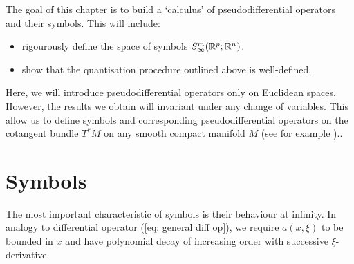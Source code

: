 \documentclass[12pt]{article}
\begin{document}
The goal of this chapter is to build a `calculus' of pseudodifferential operators and their symbols. This will include: 
\begin{itemize}
    \item rigourously define the space of symbols $S^{m}_{\infty}({\mathbb R}^{p}; {\mathbb R}^{n})$. 
    \item show that the quantisation procedure outlined above is well-defined. 
\end{itemize} 

Here, we will introduce pseudodifferential operators only on Euclidean spaces. However, the results we obtain will invariant under any change of variables.  This allow us to define symbols and corresponding pseudodifferential operators on the cotangent bundle $T^*M$ on any smooth compact manifold $M$ (see for example \cite[Chapter 2]{rbm_intro_microlocal}).. 


\section{Symbols}
The most important characteristic of symbols is their behaviour at infinity. In analogy to differential operator (\ref{eq: general diff op}), we require $a(x, \xi)$ to be bounded in $x$ and have polynomial decay of increasing order with successive $\xi$-derivative.  

\end{document}

